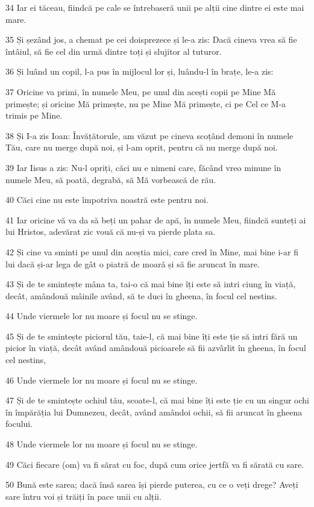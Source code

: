 \par 34 Iar ei tăceau, fiindcă pe cale se întrebaseră unii pe alții cine dintre ei este mai mare.
\par 35 Și șezând jos, a chemat pe cei doisprezece și le-a zis: Dacă cineva vrea să fie întâiul, să fie cel din urmă dintre toți și slujitor al tuturor.
\par 36 Și luând un copil, l-a pus în mijlocul lor și, luându-l în brațe, le-a zis:
\par 37 Oricine va primi, în numele Meu, pe unul din acești copii pe Mine Mă primește; și oricine Mă primește, nu pe Mine Mă primește, ci pe Cel ce M-a trimis pe Mine.
\par 38 Și I-a zis Ioan: Învățătorule, am văzut pe cineva scoțând demoni în numele Tău, care nu merge după noi, și l-am oprit, pentru că nu merge după noi.
\par 39 Iar Iisus a zis: Nu-l opriți, căci nu e nimeni care, făcând vreo minune în numele Meu, să poată, degrabă, să Mă vorbească de rău.
\par 40 Căci cine nu este împotriva noastră este pentru noi.
\par 41 Iar oricine vă va da să beți un pahar de apă, în numele Meu, fiindcă sunteți ai lui Hristos, adevărat zic vouă că nu-și va pierde plata sa.
\par 42 Și cine va sminti pe unul din aceștia mici, care cred în Mine, mai bine i-ar fi lui dacă și-ar lega de gât o piatră de moară și să fie aruncat în mare.
\par 43 Și de te smintește mâna ta, tai-o că mai bine îți este să intri ciung în viață, decât, amândouă mâinile având, să te duci în gheena, în focul cel nestins.
\par 44 Unde viermele lor nu moare și focul nu se stinge.
\par 45 Și de te smintește piciorul tău, taie-l, că mai bine îți este ție să intri fără un picior în viață, decât având amândouă picioarele să fii azvârlit în gheena, în focul cel nestins,
\par 46 Unde viermele lor nu moare și focul nu se stinge.
\par 47 Și de te smintește ochiul tău, scoate-l, că mai bine îți este ție cu un singur ochi în împărăția lui Dumnezeu, decât, având amândoi ochii, să fii aruncat în gheena focului.
\par 48 Unde viermele lor nu moare și focul nu se stinge.
\par 49 Căci fiecare (om) va fi sărat cu foc, după cum orice jertfă va fi sărată cu sare.
\par 50 Bună este sarea; dacă însă sarea își pierde puterea, cu ce o veți drege? Aveți sare întru voi și trăiți în pace unii cu alții.

